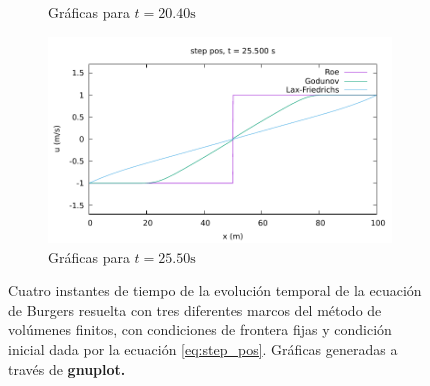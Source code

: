 \documentclass[12pt]{article}
\begin{document}
\begin{figure}[h]
\begin{subfigure}[b]{0.49\textwidth}
		\caption*{Gráficas para $t=20.40\unit{\second}$}
		\label{fig:step_pos-fija3}
	\end{subfigure}
	\vfill
	\begin{subfigure}[b]{0.49\textwidth}
		\includegraphics[width=\textwidth]{../burgers1DVF/results/sol_fijas/step_pos/850.pdf}
		\caption*{Gráficas para $t=25.50\unit{\second}$}
		\label{fig:step_pos-fija4}
	\end{subfigure}
	\caption{Cuatro instantes de tiempo de la evolución temporal de la ecuación de Burgers resuelta con tres diferentes marcos del método de volúmenes finitos, con condiciones de frontera fijas y condición inicial dada por la ecuación \ref{eq:step_pos}. Gráficas generadas a través de \textbf{gnuplot.}}
	\label{fig:step_pos-fija}
\end{figure}
\end{document}
